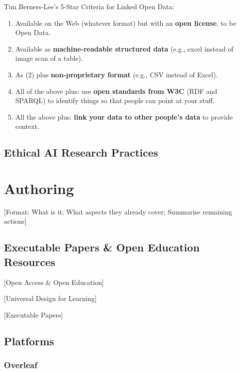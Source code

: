\documentclass[
  british,
]{article}
\providecommand{\tightlist}{%
  \setlength{\itemsep}{0pt}\setlength{\parskip}{0pt}}
\begin{document}
Tim Berners-Lee's 5-Star Criteria for Linked Open Data:

\begin{enumerate}
\def\labelenumi{\arabic{enumi}.}
\tightlist
\item
  Available on the Web (whatever format) but with an \textbf{open
  license}, to be Open Data.
\item
  Available as \textbf{machine-readable structured data} (e.g., excel
  instead of image scan of a table).
\item
  As (2) plus \textbf{non-proprietary format} (e.g., CSV instead of
  Excel).
\item
  All of the above plus: use \textbf{open standards from W3C} (RDF and
  SPARQL) to identify things so that people can point at your stuff.
\item
  All the above plus: \textbf{link your data to other people's data} to
  provide context.
\end{enumerate}

\subsection{Ethical AI Research
Practices}\label{ethical-ai-research-practices}

\section{Authoring}\label{authoring}

{[}Format: What is it; What aspects they already cover; Summarise
remaining actions{]}

\subsection{Executable Papers \& Open Education
Resources}\label{executable-papers-open-education-resources}

{[}Open Access \& Open Education{]}

{[}Universal Design for Learning{]}

{[}Executable Papers{]}

\subsection{Platforms}\label{platforms}

\subsubsection{Overleaf}\label{overleaf}
\end{document}
